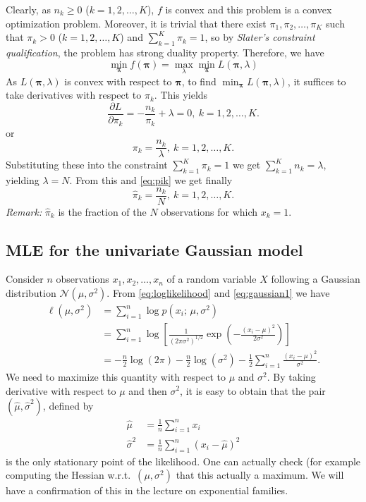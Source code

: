 \documentclass[12pt]{report}	%
\begin{document}
Clearly, as $n_k \ge 0$ ($k=1,2,\ldots,K$), $f$ is convex and this problem is a convex optimization problem. Moreover, it is trivial that there exist $\pi_1,\pi_2,\ldots,\pi_K$ such that $\pi_k > 0$ ($k=1,2,\ldots,K$) and $\sum_{k=1}^K\pi_k=1$, so by \emph{Slater's constraint qualification}, the problem has strong duality property. Therefore, we have
\begin{equation}
\min_{\bm{\pi}} f(\bm{\pi}) = \max_\lambda\min_{\bm{\pi}} L(\bm{\pi},\lambda)
\end{equation}
As $L(\bm{\pi},\lambda)$ is convex with respect to $\bm{\pi}$, to find $\min_{\bm{\pi}} L(\bm{\pi},\lambda)$, it suffices to take derivatives with respect to $\pi_k$. This yields $$\frac{\partial L}{\partial\pi_k} = -\frac{n_k}{\pi_k}+\lambda =0, \ k=1,2,\ldots,K.$$
or
\begin{equation}
\label{eq:pik}
\pi_k = \frac{n_k}{\lambda},\ k=1,2,\ldots,K.
\end{equation}
Substituting these into the constraint $\sum_{k=1}^K \pi_k = 1$ we get $\sum_{k=1}^K n_k = \lambda$, yielding $\lambda = N$. From this and \eqref{eq:pik} we get finally
\begin{equation}
\hat\pi_k = \frac{n_k}{N},\ k=1,2,\ldots,K.
\end{equation}
\textit{Remark:} $\hat\pi_k$ is the fraction of the $N$ observations for which $x_k=1$.

\subsection{MLE for the univariate Gaussian model}
Consider $n$ observations $x_1,x_2,\ldots,x_n$ of a random variable $X$ following a Gaussian distribution $\mathcal{N}(\mu,\sigma^2)$. From \eqref{eq:loglikelihood} and \eqref{eq:gaussian1} we have 
\begin{align*}
\ell(\mu,\sigma^2) 	&= \sum_{i=1}^n \log p(x_i; \, \mu,\sigma^2) \\
				&= \sum_{i=1}^n \log\left[ \frac{1}{(2\pi\sigma^2)^{1/2}}\exp\left(-\frac{(x_i-\mu)^2}{2\sigma^2}\right)\right]\\
				&= -\frac{n}{2}\log(2\pi)-\frac{n}{2}\log(\sigma^2)-\frac{1}{2}\sum_{i=1}^n \frac{(x_i-\mu)^2}{\sigma^2}.				
\end{align*} 
We need to maximize this quantity with respect to $\mu$ and $\sigma^2$. By taking derivative with respect to $\mu$ and then $\sigma^2$, it is easy to obtain that the pair $(\hat{\mu},\hat{\sigma}^2)$, defined by
\begin{align}
\hat{\mu}&=\frac{1}{n}\sum_{i=1}^n x_i \\
\hat{\sigma}^2&=\frac{1}{n}\sum_{i=1}^n \left(x_i-\hat{\mu}\right)^2
\end{align}
is the only stationary point of the likelihood. One can actually check (for example computing the Hessian w.r.t.~$(\mu,\sigma^2)$ that this actually a maximum. We will have a confirmation of this in the lecture on exponential families.  
\end{document}
